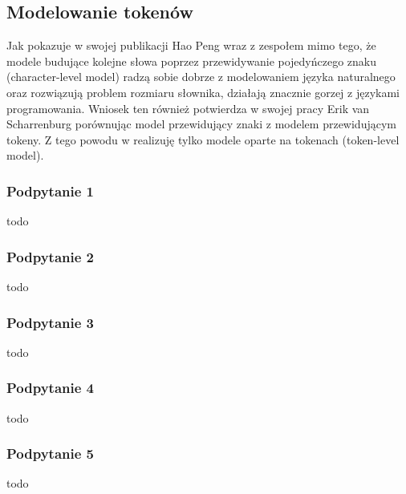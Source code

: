 \subsection{Modelowanie tokenów}
Jak pokazuje w swojej publikacji Hao Peng wraz z zespołem \cite{character-level} mimo tego, że modele budujące kolejne słowa poprzez 
przewidywanie pojedyńczego znaku (character-level model) radzą sobie dobrze z modelowaniem języka naturalnego oraz rozwiązują problem rozmiaru słownika, 
działają znacznie gorzej z językami programowania. Wniosek ten również potwierdza w swojej pracy Erik van Scharrenburg \cite{erik} porównując model przewidujący 
znaki z modelem przewidującym tokeny. Z tego powodu w  realizuję tylko modele oparte na tokenach (token-level model). 
\subsubsection{Podpytanie 1}
todo
\subsubsection{Podpytanie 2}
todo
\subsubsection{Podpytanie 3}
todo
\subsubsection{Podpytanie 4}
todo
\subsubsection{Podpytanie 5}
todo

